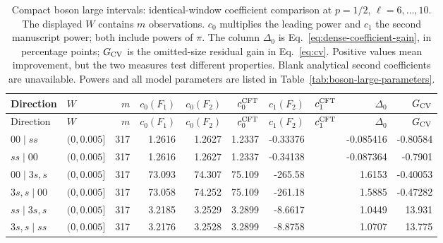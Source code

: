 \begingroup\setlength{\tabcolsep}{2pt}
\begin{longtable}{llrrrrrrrr}
\caption{Compact boson large intervals: identical-window coefficient comparison at $p=1/2$, $\ell=6,\ldots,10$. The displayed $W$ contains $m$ observations. $c_0$ multiplies the leading power and $c_1$ the second manuscript power; both include powers of $\pi$. The column $\Delta_0$ is Eq.~\eqref{eq:dense-coefficient-gain}, in percentage points; $G_{\rm CV}$ is the omitted-size residual gain in Eq.~\eqref{eq:cv}. Positive values mean improvement, but the two measures test different properties. Blank analytical second coefficients are unavailable. Powers and all model parameters are listed in Table~\ref{tab:boson-large-parameters}.}
\label{tab:dense-large-boson}\\\toprule
Direction & $W$ & $m$ & $c_0(F_1)$ & $c_0(F_2)$ & $c_0^{\rm CFT}$ & $c_1(F_2)$ & $c_1^{\rm CFT}$ & $\Delta_0$ & $G_{\rm CV}$\\\midrule
\endfirsthead
\toprule
Direction & $W$ & $m$ & $c_0(F_1)$ & $c_0(F_2)$ & $c_0^{\rm CFT}$ & $c_1(F_2)$ & $c_1^{\rm CFT}$ & $\Delta_0$ & $G_{\rm CV}$\\\midrule
\endhead
\bottomrule\endfoot
$00\mid ss$ & $(0,0.005]$ & 317 & 1.2616 & 1.2627 & 1.2337 & -0.33376 &  & -0.085416 & -0.80584\\
$ss\mid 00$ & $(0,0.005]$ & 317 & 1.2616 & 1.2627 & 1.2337 & -0.34138 &  & -0.087364 & -0.7901\\
$00\mid 3s,s$ & $(0,0.005]$ & 317 & 73.093 & 74.307 & 75.109 & -265.58 &  & 1.6153 & -0.40053\\
$3s,s\mid 00$ & $(0,0.005]$ & 317 & 73.058 & 74.252 & 75.109 & -261.18 &  & 1.5885 & -0.47282\\
$ss\mid 3s,s$ & $(0,0.005]$ & 317 & 3.2185 & 3.2529 & 3.2899 & -8.6617 &  & 1.0449 & 13.931\\
$3s,s\mid ss$ & $(0,0.005]$ & 317 & 3.2176 & 3.2528 & 3.2899 & -8.8758 &  & 1.0707 & 13.775\\
\end{longtable}
\endgroup
